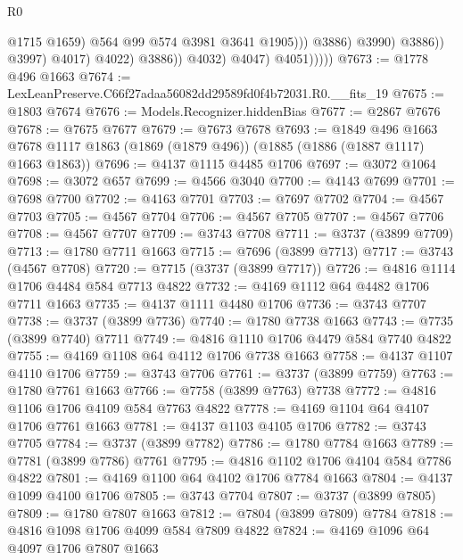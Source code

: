 \begin{lexlean}{R0}
\begin{coremodule}
                                            @1715
                                            @1659)
                                          @564
                                          @99
                                          @574
                                          @3981
                                          @3641
                                          @1905)))
                                    @3886)
                                  @3990)
                                @3886))
                            @3997)
                          @4017)
                        @4022)
                      @3886))
                  @4032)
                @4047)
              @4051)))))
@7673 := @1778 @496 @1663
@7674 := LexLeanPreserve.C66f27adaa56082dd29589fd0f4b72031.R0.__fits_19
@7675 := @1803 @7674
@7676 := Models.Recognizer.hiddenBias
@7677 := @2867 @7676
@7678 := @7675 @7677
@7679 := @7673 @7678
@7693 := @1849
    @496
    @1663
    @7678
    @1117
    @1863
    (@1869 (@1879 @496))
    (@1885 (@1886 (@1887 @1117) @1663 @1863))
@7696 := @4137 @1115 @4485 @1706
@7697 := @3072 @1064
@7698 := @3072 @657
@7699 := @4566 @3040
@7700 := @4143 @7699
@7701 := @7698 @7700
@7702 := @4163 @7701
@7703 := @7697 @7702
@7704 := @4567 @7703
@7705 := @4567 @7704
@7706 := @4567 @7705
@7707 := @4567 @7706
@7708 := @4567 @7707
@7709 := @3743 @7708
@7711 := @3737 (@3899 @7709)
@7713 := @1780 @7711 @1663
@7715 := @7696 (@3899 @7713)
@7717 := @3743 (@4567 @7708)
@7720 := @7715 (@3737 (@3899 @7717))
@7726 := @4816 @1114 @1706 @4484 @584 @7713 @4822
@7732 := @4169 @1112 @64 @4482 @1706 @7711 @1663
@7735 := @4137 @1111 @4480 @1706
@7736 := @3743 @7707
@7738 := @3737 (@3899 @7736)
@7740 := @1780 @7738 @1663
@7743 := @7735 (@3899 @7740) @7711
@7749 := @4816 @1110 @1706 @4479 @584 @7740 @4822
@7755 := @4169 @1108 @64 @4112 @1706 @7738 @1663
@7758 := @4137 @1107 @4110 @1706
@7759 := @3743 @7706
@7761 := @3737 (@3899 @7759)
@7763 := @1780 @7761 @1663
@7766 := @7758 (@3899 @7763) @7738
@7772 := @4816 @1106 @1706 @4109 @584 @7763 @4822
@7778 := @4169 @1104 @64 @4107 @1706 @7761 @1663
@7781 := @4137 @1103 @4105 @1706
@7782 := @3743 @7705
@7784 := @3737 (@3899 @7782)
@7786 := @1780 @7784 @1663
@7789 := @7781 (@3899 @7786) @7761
@7795 := @4816 @1102 @1706 @4104 @584 @7786 @4822
@7801 := @4169 @1100 @64 @4102 @1706 @7784 @1663
@7804 := @4137 @1099 @4100 @1706
@7805 := @3743 @7704
@7807 := @3737 (@3899 @7805)
@7809 := @1780 @7807 @1663
@7812 := @7804 (@3899 @7809) @7784
@7818 := @4816 @1098 @1706 @4099 @584 @7809 @4822
@7824 := @4169 @1096 @64 @4097 @1706 @7807 @1663

\end{coremodule}
\end{lexlean}
